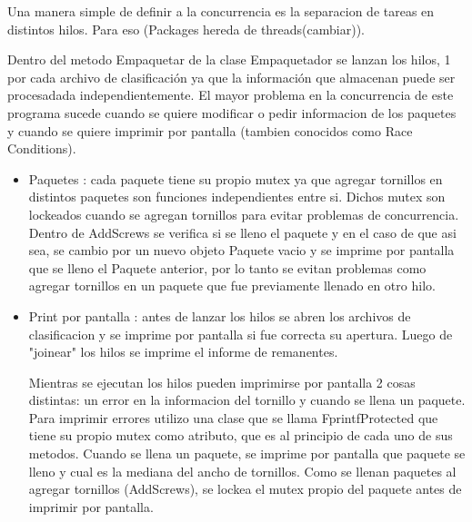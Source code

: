 \documentclass[a4paper,12pt]{report}
\begin{document}
Una manera simple de definir a la concurrencia es la separacion de tareas en distintos hilos. Para eso (Packages hereda de threads(cambiar)). 

Dentro del metodo Empaquetar de la clase Empaquetador se lanzan los hilos, 1 por cada archivo de clasificaci\'on ya que la informaci\'on que almacenan puede ser procesadada independientemente. El mayor problema en la concurrencia de este programa sucede cuando se quiere modificar o pedir informacion de los paquetes y cuando se quiere imprimir por pantalla (tambien conocidos como Race Conditions). 

\begin{itemize}

\item Paquetes : cada paquete tiene su propio mutex ya que agregar tornillos en distintos paquetes son funciones independientes entre si. Dichos mutex son lockeados cuando se agregan tornillos para evitar problemas de concurrencia. Dentro de AddScrews se verifica si se lleno el paquete y en el caso de que asi sea, se cambio por un nuevo objeto Paquete vacio y se imprime por pantalla que se lleno el Paquete anterior, por lo tanto se evitan problemas como agregar tornillos en un paquete que fue previamente llenado en otro hilo.

\item Print por pantalla : antes de lanzar los hilos se abren los archivos de clasificacion y se imprime por pantalla si fue correcta su apertura. Luego de "joinear" los hilos se imprime el informe de remanentes.

Mientras se ejecutan los hilos pueden imprimirse por pantalla 2 cosas distintas: un error en la informacion del tornillo y cuando se llena un paquete. Para imprimir errores utilizo una clase que se llama FprintfProtected que tiene su propio mutex como atributo, que es al principio de cada uno de sus metodos. Cuando se llena un paquete, se imprime por pantalla que paquete se lleno y cual es la mediana del ancho de tornillos. Como se llenan paquetes al agregar tornillos (AddScrews), se lockea el mutex propio del paquete antes de imprimir por pantalla.  

\end{itemize}
\end{document}
